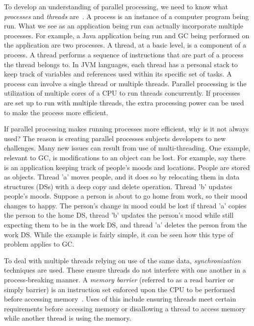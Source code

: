 \documentclass{sig-alternate}
\begin{document}
To develop an understanding of parallel processing, we need to know 
what \emph{processes} and \emph{threads} are~\cite{oracle:threads}.
A process is an instance of a computer program being run. What we
see as an application being run can actually incorporate multiple processes.
For example, a Java application being run and GC being performed on the application are two processes.
A thread, at a basic level, is a component of a process. A thread performs a sequence
of instructions that are part of a process the thread belongs to. In JVM languages,
each thread has a personal stack to keep track of variables
and references used within its specific set of tasks. A process
can involve a single thread or multiple threads.
Parallel processing is the utilization of multiple
cores of a CPU to run threads concurrently. If processes are set up
to run with multiple threads, the extra processing power can be used to make 
the process more efficient.

If parallel processing makes running processes more efficient, why is it not
always used? The reason is creating parallel processes subjects
developers to new challenges. Many new issues can result from use of
multi-threading. One example, relevant to GC, is modifications to an 
object can be lost. For example, say there is an application keeping 
track of people's moods and locations. People are stored as objects. 
Thread 'a' moves people, and it does so by relocating them in data structures (DSs) 
with a deep copy and delete operation. Thread 'b' updates people's moods. Suppose a person
is about to go home from work, so their mood changes to happy.
The person's change in mood could be lost if thread 'a' copies the person
to the home DS, thread 'b' updates the person's mood while still expecting
them to be in the work DS, and thread 'a' deletes the person from the work DS. 
While the example is fairly simple, it can be seen how this type of problem
applies to GC.

To deal with multiple threads relying on use of the same data, \emph{synchronization}
techniques are used. These ensure threads do not interfere
with one another in a process-breaking manner. A \emph{memory barrier} (referred to 
as a read barrier or simply barrier) is an instruction set enforced upon the 
CPU to be performed before accessing memory~\cite{wiki:barrier}. Uses of this include ensuring threads
meet certain requirements before accessing memory or disallowing a thread to
access memory while another thread is using the memory.
 
\end{document}
